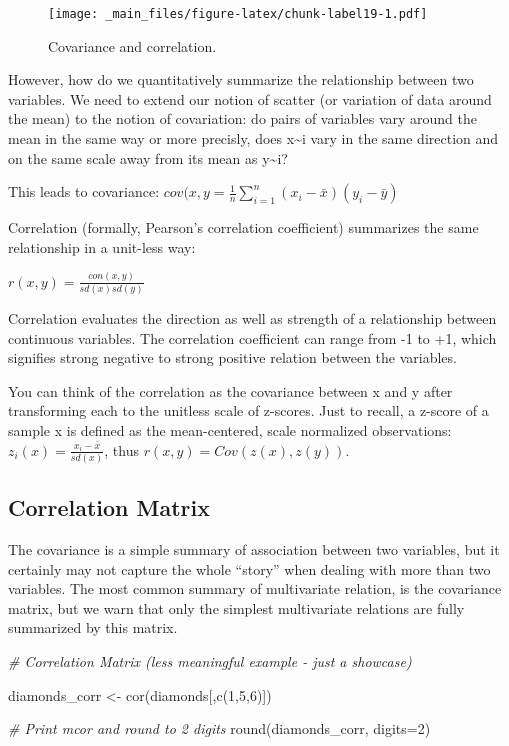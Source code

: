 \documentclass[
]{book}
\newenvironment{Shaded}{\begin{snugshade}}{\end{snugshade}}
\newcommand{\AttributeTok}[1]{\textcolor[rgb]{0.77,0.63,0.00}{#1}}
\newcommand{\CommentTok}[1]{\textcolor[rgb]{0.56,0.35,0.01}{\textit{#1}}}
\newcommand{\DecValTok}[1]{\textcolor[rgb]{0.00,0.00,0.81}{#1}}
\newcommand{\FunctionTok}[1]{\textcolor[rgb]{0.00,0.00,0.00}{#1}}
\newcommand{\NormalTok}[1]{#1}
\newcommand{\OtherTok}[1]{\textcolor[rgb]{0.56,0.35,0.01}{#1}}
\begin{document}
\begin{figure}
\centering
\texttt{[image: \_main\_files/figure-latex/chunk-label19-1.pdf]}
\caption{\label{fig:chunk-label19}Covariance and correlation.}
\end{figure}

However, how do we quantitatively summarize the relationship between two variables. We need to extend our notion of scatter (or variation of data around the mean) to the notion of covariation: do pairs of variables vary around the mean in the same way or more precisly, does x\textasciitilde i vary in the same direction and on the same scale away from its mean as y\textasciitilde i?

This leads to covariance:
\(cov(x,y =\frac{1}{n}\sum_{i=1}^{n}(x_i - \bar{x})(y_i -\bar{y})\)

Correlation (formally, Pearson's correlation coefficient) summarizes the same relationship in a unit-less way:

\(r(x,y)=\frac{con(x,y)}{sd(x)sd(y)}\)

Correlation evaluates the direction as well as strength of a relationship between continuous variables. The correlation coefficient can range from -1 to +1, which signifies strong negative to strong positive relation between the variables.

You can think of the correlation as the covariance between x and y after transforming each to the unitless scale of z-scores. Just to recall, a z-score of a sample x is defined as the mean-centered, scale normalized observations: \(z_i(x)=\frac{x_i-\bar{x}}{sd(x)}\), thus \(r(x,y)=Cov(z(x),z(y))\).

\hypertarget{correlation-matrix}{%
\subsection{Correlation Matrix}\label{correlation-matrix}}

The covariance is a simple summary of association between two variables, but it certainly may not capture the whole ``story'' when dealing with more than two variables. The most common summary of multivariate relation, is the covariance matrix, but we warn that only the simplest multivariate relations are fully summarized by this matrix.

\begin{Shaded}
\begin{Highlighting}[]
\CommentTok{\# Correlation Matrix (less meaningful example {-} just a showcase)}

\NormalTok{diamonds\_corr }\OtherTok{\textless{}{-}} \FunctionTok{cor}\NormalTok{(diamonds[,}\FunctionTok{c}\NormalTok{(}\DecValTok{1}\NormalTok{,}\DecValTok{5}\NormalTok{,}\DecValTok{6}\NormalTok{)])}

\CommentTok{\# Print mcor and round to 2 digits}
\FunctionTok{round}\NormalTok{(diamonds\_corr, }\AttributeTok{digits=}\DecValTok{2}\NormalTok{)}
\end{Highlighting}
\end{Shaded}
\end{document}

